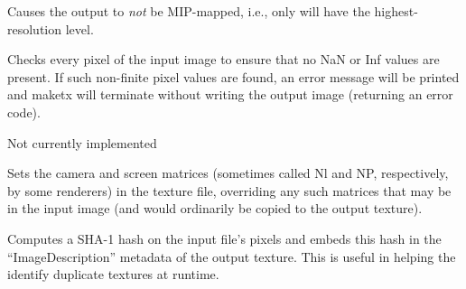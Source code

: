 Causes the output to \emph{not} be MIP-mapped, i.e., only will have
the highest-resolution level.
\apiend

Checks every pixel of the input image to ensure that no NaN or Inf
values are present.  If such non-finite pixel values are found, 
an error message will be printed and {\cf maketx} will terminate without
writing the output image (returning an error code).
\apiend

Not currently implemented
\apiend

Sets the camera and screen matrices (sometimes called {\cf Nl} and
{\cf NP}, respectively, by some renderers) in the texture file, 
overriding any such matrices that may be in the input image (and would
ordinarily be copied to the output texture).
\apiend

Computes a SHA-1 hash on the input file's pixels and embeds this hash
in the ``ImageDescription'' metadata of the output texture.  This is
useful in helping the \TextureSystem identify duplicate textures at
runtime.
\apiend



\begin{comment}

\section{{\cf maketx} Recipes}


This section will give quick examples of common uses of {\cf maketx}.

\subsection*{Converting between file formats}

It's a snap to converting among image formats supported by \product
(i.e., for which \ImageInput and \ImageOutput plugins can be found).
The {\cf maketx} utility will simply infer the file format from the
file extension. The following example converts a PNG image to JPEG:

\begin{code}
    maketx lena.png lena.jpg
\end{code}

\end{comment}
